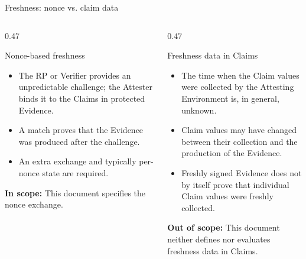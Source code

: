 \documentclass[aspectratio=169,10pt]{beamer}
\begin{document}
\begin{frame}{Freshness: nonce vs. claim data}
  \footnotesize
  \begin{columns}[T,onlytextwidth]
    \begin{column}{0.47\textwidth}
      \begin{block}{Nonce-based freshness}
        \begin{itemize}
          \setlength{\itemsep}{2pt}
          \item The RP or Verifier provides an unpredictable challenge;
                the Attester binds it to the Claims in protected Evidence.
          \item A match proves that the Evidence was produced after the
                challenge.
          \item An extra exchange and typically per-nonce state are required.
        \end{itemize}
        \vspace{0.08cm}
        \textcolor{good}{\bfseries In scope:} This document specifies the
        nonce exchange.
      \end{block}
    \end{column}
    \begin{column}{0.47\textwidth}
      \begin{block}{Freshness data in Claims}
        \begin{itemize}
          \setlength{\itemsep}{2pt}
          \item The time when the Claim values were collected by the
                Attesting Environment is, in general, unknown.
          \item Claim values may have changed between their collection and the
                production of the Evidence.
          \item Freshly signed Evidence does not by itself prove that individual Claim
                values were freshly collected.
        \end{itemize}
        \vspace{0.08cm}
        \textcolor{accent}{\bfseries Out of scope:} This document neither
        defines nor evaluates freshness data in Claims.
      \end{block}
    \end{column}
  \end{columns}
\end{frame}
\end{document}
